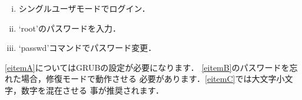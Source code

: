 
\begin{inout}
\usepackage{enumerate}
\begin{enumerate}[(i)]
 \item シングルユーザモードでログイン．\label{eitemA}
 \item `root'のパスワードを入力．\label{eitemB}
 \item `passwd'コマンドでパスワード変更．\label{eitemC}
\end{enumerate} 
\ref{eitemA}についてはGRUBの設定が必要になります．
\ref{eitemB}のパスワードを忘れた場合，修復モードで動作させる
必要があります．\ref{eitemC}では大文字小文字，数字を混在させる
事が推奨されます．
\end{inout}






%
%



